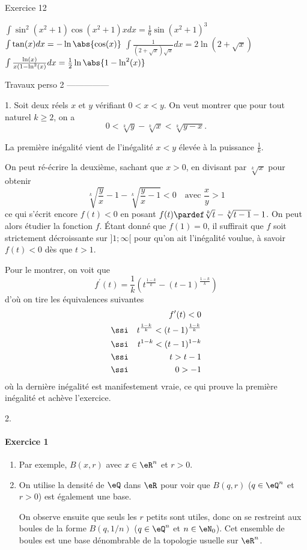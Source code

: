  Exercice 12
 \begin{enumerate}
   \exr $\int \sin^2(x^2+1) \cos(x^2+1) x d x = \frac16
   \sin(x^2+1)^3$%
   \exr $\int \tan(x) d x = -\ln\abs{\cos(x)}$%
   \exr $\int \frac{1}{(2+\sqrt{x})\sqrt x} d x= 2 \ln(2+\sqrt{x})$%
   \exr $\int \frac{\ln(x)}{x(1- \ln^2(x)} d x = \frac12
   \ln\abs{1-\ln^2(x)}$%
 \end{enumerate}



   Travaux perso 2 ---------------

   1. Soit deux réels $x$ et $y$ vérifiant $0 < x < y$. On veut montrer
   que pour tout naturel $k \geq 2$, on a
   \[0 < \sqrt[k]{y} - \sqrt[k]{x} < \sqrt[k]{y-x}.\]

   La première inégalité vient de l'inégalité $x < y$ élevée à la
   puissance $\frac1k$.

   On peut ré-écrire la deuxième, sachant que $x > 0$, en divisant par
   $\sqrt[k]{x}$ pour obtenir
   \[\sqrt[k]{\frac yx} - 1 - \sqrt[k]{\frac yx-1} < 0 \quad \text{
     avec $\frac xy > 1$}\] ce qui s'écrit encore $f(t) < 0$ en posant
   $f(t) \pardef \sqrt[k]t - \sqrt[k]{t-1} - 1$. On peut alors étudier
   la fonction $f$. Étant donné que $f(1) = 0$, il suffirait que $f$
   soit strictement décroissante sur $]1;\infty[$ pour qu'on ait
   l'inégalité voulue, à savoir $f(t) < 0$ dès que $t > 1$.

   Pour le montrer, on voit que
   \[f^\prime(t) = \frac 1k \left(t^{\frac{1-k}k} -
     ({t-1})^{\frac{1-k}k}\right)\] d'où on tire les équivalences
   suivantes
   \begin{align}
     & & f^\prime(t) < 0\\
     &\ssi& t^{\frac{1-k}k} < ({t-1})^{\frac{1-k}k}\\
     &\ssi& t^{1-k} < ({t-1})^{1-k}\\
     &\ssi& t > t-1\\
     &\ssi& 0 > -1
   \end{align}
   où la dernière inégalité est manifestement vraie, ce qui prouve la
   première inégalité et achève l'exercice.

   2.


 \paragraph{Exercice 1}
 \begin{enumerate}
 \item Par exemple, $B(x,r)$ avec $x \in \eR^n$ et $r > 0$.

 \item On utilise la densité de $\eQ$ dans $\eR$ pour voir que $B(q,r)$
   ($q \in \eQ^n$ et $r > 0$) est également une base.

   On observe ensuite que seuls les $r$ \og petits\fg{} sont utiles,
   donc on se restreint aux boules de la forme $B(q,1/n)$ ($q \in
   \eQ^n$ et $n \in \eN_0$). Cet ensemble de boules est une base
   dénombrable de la topologie usuelle sur
   $\eR^n$.
 \end{enumerate}


